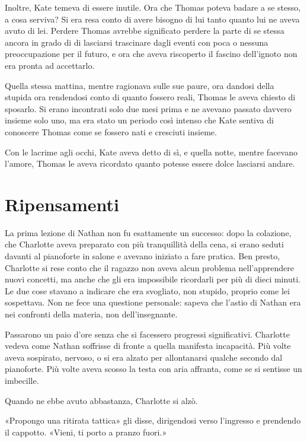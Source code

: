 \documentclass[a4paper,oneside,11pt]{memoir}
\begin{document}
Inoltre, Kate temeva di essere inutile. Ora che Thomas poteva badare a se
stesso, a cosa serviva? Si era resa conto di avere bisogno di lui tanto quanto
lui ne aveva avuto di lei. Perdere Thomas avrebbe significato perdere la parte
di se stessa ancora in grado di di lasciarsi trascinare dagli eventi con poca o
nessuna preoccupazione per il futuro, e ora che aveva riscoperto il fascino
dell'ignoto non era pronta ad accettarlo.

Quella stessa mattina, mentre ragionava sulle sue paure, ora dandosi della
stupida ora rendendosi conto di quanto fossero reali, Thomas le aveva chiesto di
sposarlo. Si erano incontrati solo due mesi prima e ne avevano passato davvero
insieme solo uno, ma era stato un periodo così intenso che Kate sentiva di
conoscere Thomas come se fossero nati e cresciuti insieme.

Con le lacrime agli occhi, Kate aveva detto di sì, e quella notte, mentre
facevano l'amore, Thomas le aveva ricordato quanto potesse essere dolce
lasciarsi andare.

\chapter{Ripensamenti}

La prima lezione di Nathan non fu esattamente un successo: dopo la colazione,
che Charlotte aveva preparato con più tranquillità della cena, si erano seduti
davanti al pianoforte in salone e avevano iniziato a fare pratica. Ben presto,
Charlotte si rese conto che il ragazzo non aveva alcun problema nell'apprendere
nuovi concetti, ma anche che gli era impossibile ricordarli per più di dieci
minuti. Le due cose stavano a indicare che era svogliato, non stupido, proprio
come lei sospettava. Non ne fece una questione personale: sapeva che l'astio di
Nathan era nei confronti della materia, non dell'insegnante.

Passarono un paio d'ore senza che si facessero progressi significativi.
Charlotte vedeva come Nathan soffrisse di fronte a quella manifesta incapacità.
Più volte aveva sospirato, nervoso, o si era alzato per allontanarsi qualche
secondo dal pianoforte. Più volte aveva scosso la testa con aria affranta, come
se si sentisse un imbecille.

Quando ne ebbe avuto abbastanza, Charlotte si alzò.

«Propongo una ritirata tattica» gli disse, dirigendosi verso l'ingresso e
prendendo il cappotto. «Vieni, ti porto a pranzo fuori.»
\end{document}
